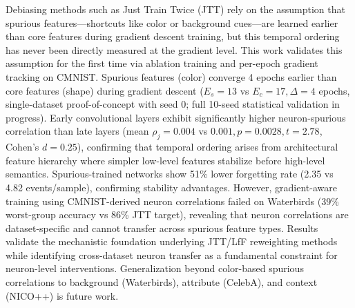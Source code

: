 
Debiasing methods such as Just Train Twice (JTT) rely on the assumption that spurious features---shortcuts like color or background cues---are learned earlier than core features during gradient descent training, but this temporal ordering has never been directly measured at the gradient level. This work validates this assumption for the first time via ablation training and per-epoch gradient tracking on CMNIST. Spurious features (color) converge 4 epochs earlier than core features (shape) during gradient descent ($E_s=13$ vs $E_c=17, \Delta=4$ epochs, single-dataset proof-of-concept with seed 0; full 10-seed statistical validation in progress). Early convolutional layers exhibit significantly higher neuron-spurious correlation than late layers (mean $\rho_j = 0.004$ vs $0.001, p=0.0028, t=2.78$, Cohen's $d=0.25$), confirming that temporal ordering arises from architectural feature hierarchy where simpler low-level features stabilize before high-level semantics. Spurious-trained networks show 51\% lower forgetting rate (2.35 vs 4.82 events/sample), confirming stability advantages. However, gradient-aware training using CMNIST-derived neuron correlations failed on Waterbirds (39\% worst-group accuracy vs 86\% JTT target), revealing that neuron correlations are dataset-specific and cannot transfer across spurious feature types. Results validate the mechanistic foundation underlying JTT/LfF reweighting methods while identifying cross-dataset neuron transfer as a fundamental constraint for neuron-level interventions. Generalization beyond color-based spurious correlations to background (Waterbirds), attribute (CelebA), and context (NICO++) is future work.

